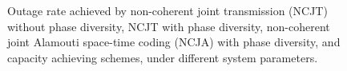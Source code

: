 \documentclass[10pt,journal,a4paper]{IEEEtran}
\begin{document}
\begin{figure}
\centerline{
\hfil
{}
\hfil
{}}
\caption{Outage rate achieved by non-coherent joint transmission (NCJT) without phase diversity, NCJT with phase diversity, non-coherent joint Alamouti space-time coding (NCJA) with phase diversity, and capacity achieving schemes, under different system parameters.}
\label{fig:R_out}
\end{figure}
\end{document}
